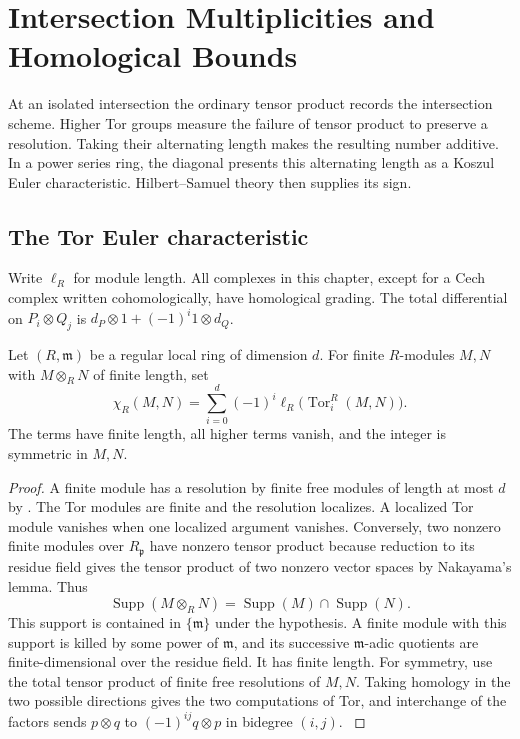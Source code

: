 \chapter{Intersection Multiplicities and Homological Bounds}
\label{ch:intersection-multiplicities}

At an isolated intersection the ordinary tensor product records the
intersection scheme. Higher Tor groups measure the failure of tensor
product to preserve a resolution. Taking their alternating length makes
the resulting number additive. In a power series ring, the diagonal
presents this alternating length as a Koszul Euler characteristic.
Hilbert--Samuel theory then supplies its sign.
\cite[Chapter V]{serre-local}

\section{The Tor Euler characteristic}

Write \(\ell_R\) for module length. All complexes in this chapter, except
for a Cech complex written cohomologically, have homological grading.
The total differential on \(P_i\otimes Q_j\) is
\(d_P\otimes 1+(-1)^i1\otimes d_Q\).

\begin{definition}\label{res:I01}
Let \((R,\mathfrak m)\) be a regular local ring of dimension \(d\).
For finite \(R\)-modules \(M,N\) with \(M\otimes_R N\) of finite length, set
\[
 \chi_R(M,N)=\sum_{i=0}^d(-1)^i
                \ell_R\bigl(\operatorname{Tor}_i^R(M,N)\bigr).
\]
The terms have finite length, all higher terms vanish, and the integer is
symmetric in \(M,N\).
\end{definition}
\begin{proof}
A finite module has a resolution by finite free modules of length at
most \(d\) by \cite[CM-12 or CM-19]{core}. The Tor modules are finite
and the resolution localizes. A localized Tor module vanishes when
one localized argument vanishes. Conversely, two nonzero finite
modules over \(R_{\mathfrak p}\) have nonzero tensor product because reduction
to its residue field gives the tensor product of two nonzero vector
spaces by Nakayama's lemma. Thus
\[
 \operatorname{Supp}(M\otimes_R N)
   =\operatorname{Supp}(M)\cap\operatorname{Supp}(N).
\]
This support is contained in \(\{\mathfrak m\}\) under the hypothesis.
A finite module with this support is killed by some power of
\(\mathfrak m\), and its successive \(\mathfrak m\)-adic quotients are
finite-dimensional over the residue field. It has finite length.
For symmetry, use the total tensor product of finite free resolutions
of \(M,N\). Taking homology in the two possible directions gives the
two computations of Tor, and interchange of the factors sends
\(p\otimes q\) to \((-1)^{ij}q\otimes p\) in bidegree \((i,j)\).
\cite[\S2]{dugger}
\end{proof}

